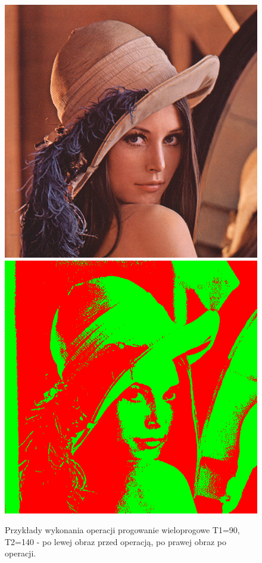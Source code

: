 \documentclass{article}
\begin{document}
\begin{figure}[!htb]
\centering
\includegraphics[scale=0.269]{img/lena_24bit.png} 
\includegraphics[scale=0.2]{img/Progowanie_Wieloprogowe_lena_24bit.png} 
\caption{Przykłady wykonania operacji progowanie wieloprogowe T1=90, T2=140 - po lewej obraz przed operacją, po prawej obraz po operacji. }
\end{figure}
\end{document}
